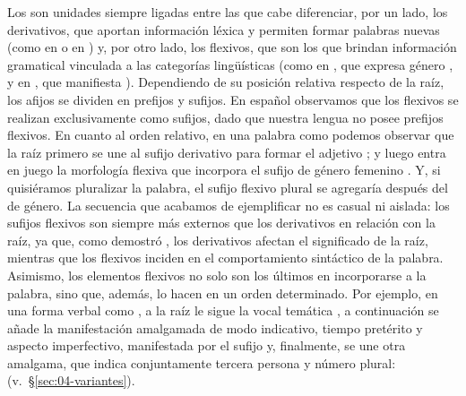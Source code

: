 Los  son unidades siempre ligadas entre las que cabe
diferenciar, por un lado, los derivativos, que aportan información léxica y
permiten formar palabras nuevas (como  en  o
 en ) y, por otro lado, los flexivos, que son
los que brindan información gramatical vinculada a las categorías lingüísticas
(como  en , que expresa género , y
 en , que manifiesta ). Dependiendo de
su posición relativa respecto de la raíz, los afijos se dividen en prefijos y
sufijos. En español observamos que los flexivos se realizan exclusivamente como
sufijos, dado que nuestra lengua no posee prefijos
flexivos. En cuanto al orden relativo, en una palabra como
 podemos observar que la raíz  primero se une
al sufijo derivativo  para formar el adjetivo ; y
luego entra en juego la morfología flexiva que incorpora el sufijo de género
femenino . Y, si quisiéramos pluralizar la palabra, el sufijo flexivo
plural  se agregaría después del de género. La secuencia que acabamos
de ejemplificar no es casual ni aislada: los sufijos flexivos son siempre más
externos que los derivativos en relación con la raíz, ya que, como demostró
\textcite{bybee1985}, los derivativos afectan el significado de la raíz,
mientras que los flexivos inciden en el comportamiento sintáctico de la palabra.
Asimismo, los elementos flexivos no solo son los últimos en incorporarse a la
palabra, sino que, además, lo hacen en un orden determinado. Por ejemplo, en una
forma verbal como , a la raíz  le sigue la
vocal temática , a continuación se añade la manifestación amalgamada
de modo indicativo, tiempo pretérito y aspecto imperfectivo, manifestada por el
sufijo  y, finalmente, se une otra amalgama, que indica
conjuntamente tercera persona y número plural: 
(v.~§\ref{sec:04-variantes}).

